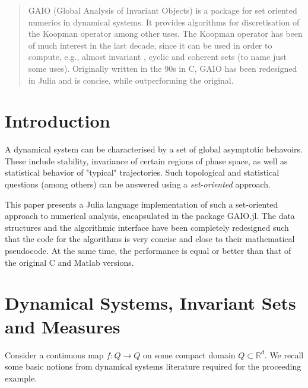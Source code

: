 \documentclass{juliacon}
\newcommand{\R}{{\mathbb R}}
\begin{document}


\maketitle

\begin{abstract}

GAIO (Global Analysis of Invariant Objects) is a package for set oriented numerics in dynamical systems. It provides algorithms for discretisation of the Koopman operator among other uses. The Koopman operator has been of much interest in the last decade, since it can be used in order to compute, e.g., almost invariant \cite{almostinvariant}, cyclic \cite{complicatedbehavior} and coherent sets \cite{coherent} (to name just some uses). Originally written in the 90s in C, GAIO has been redesigned in Julia and is concise, while outperforming the original.

\end{abstract}

\section{Introduction}

A dynamical system can be characterised by a set of global asymptotic behavoirs. These include stability, invariance of certain regions of phase space, as well as statistical behavior of "typical" trajectories. Such topological and statistical questions (among others) can be answered using a \emph{set-oriented} approach. 

This paper presents a Julia language implementation of such a set-oriented approach to numerical analysis, encapsulated in the package GAIO.jl. The data structures and the algorithmic interface have been completely redesigned such that the code for the algorithms is very concise and close to their mathematical pseudocode. At the same time, the performance is equal or better than that of the original C and Matlab versions. 

\section{Dynamical Systems, Invariant Sets and Measures}

Consider a continuous map $f : Q \to Q$ on some compact domain $Q \subset \R^d$. We recall some basic notions from dynamical systems literature required for the proceeding example. 
\end{document}
